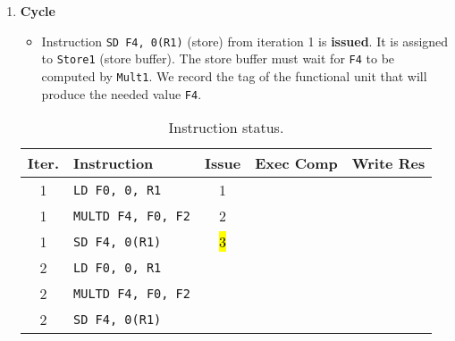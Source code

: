 \begin{enumerate}
    \newpage


    \item \textbf{Cycle \theenumi}
    \begin{itemize}
        \item Instruction \texttt{SD F4, 0(R1)} (store) from iteration 1 is \textbf{issued}. It is assigned to \texttt{Store1} (store buffer). The store buffer must wait for \texttt{F4} to be computed by \texttt{Mult1}. We record the tag of the functional unit that will produce the needed value \texttt{F4}.
    \end{itemize}
    \begin{table}[!htp]
        \centering
        \begin{tabular}{@{} c l | c c c @{}}
            \toprule
            Iter.       & Instruction                   & Issue & Exec Comp & Write Res \\
            \midrule
            1           & \texttt{LD    F0, 0, R1}      & 1     &           &           \\ [.3em]
            1           & \texttt{MULTD F4, F0, F2}     & 2     &           &           \\ [.3em]
            1           & \texttt{SD    F4, 0(R1)}      & \hl{3}&           &           \\ [.3em]
            2           & \texttt{LD    F0, 0, R1}      &       &           &           \\ [.3em]
            2           & \texttt{MULTD F4, F0, F2}     &       &           &           \\ [.3em]
            2           & \texttt{SD    F4, 0(R1)}      &       &           &           \\
            \bottomrule
        \end{tabular}
        \caption*{Instruction status.}
    \end{table}


\end{enumerate}

